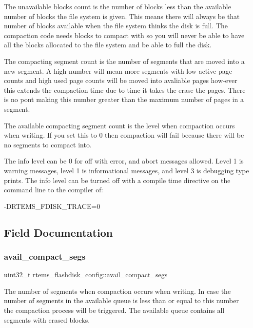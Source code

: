 The unavailable blocks count is the number of blocks less than the available number of blocks the file system is given. This means there will always be that number of blocks available when the file system thinks the disk is full. The compaction code needs blocks to compact with so you will never be able to have all the blocks allocated to the file system and be able to full the disk.

The compacting segment count is the number of segments that are moved into a new segment. A high number will mean more segments with low active page counts and high used page counts will be moved into avaliable pages how-\/ever this extends the compaction time due to time it takes the erase the pages. There is no pont making this number greater than the maximum number of pages in a segment.

The available compacting segment count is the level when compaction occurs when writing. If you set this to 0 then compaction will fail because there will be no segments to compact into.

The info level can be 0 for off with error, and abort messages allowed. Level 1 is warning messages, level 1 is informational messages, and level 3 is debugging type prints. The info level can be turned off with a compile time directive on the command line to the compiler of\+: \begin{DoxyVerb}-DRTEMS_FDISK_TRACE=0
\end{DoxyVerb}
 

\subsection{Field Documentation}
\mbox{\label{structrtems__flashdisk__config_a24b0928570dd72694937dee16ebbc4e5}} 
\subsubsection{\texorpdfstring{avail\_compact\_segs}{avail\_compact\_segs}}
{\footnotesize\ttfamily uint32\+\_\+t rtems\+\_\+flashdisk\+\_\+config\+::avail\+\_\+compact\+\_\+segs}

The number of segments when compaction occurs when writing. In case the number of segments in the available queue is less than or equal to this number the compaction process will be triggered. The available queue contains all segments with erased blocks. \mbox{\label{structrtems__flashdisk__config_a50fe17de497dc86963fb14f36cfdf118}} 
